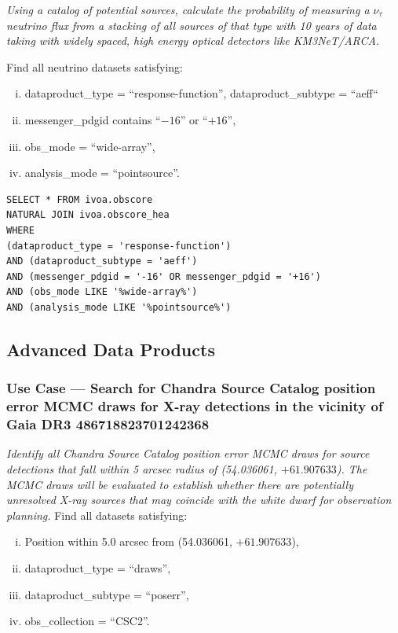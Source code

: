 {\em Using a catalog of potential sources, calculate the probability of measuring a $\nu_{\tau}$ neutrino flux from a stacking of all sources of that type with 10 years of data taking with widely spaced, high energy optical detectors like KM3NeT/ARCA.}

\medskip
\noindent Find all neutrino datasets satisfying:
\begin{enumerate}[(i)]
  \item dataproduct\_type = ``response-function'', dataproduct\_subtype = ``aeff``
  \item messenger\_pdgid contains ``$-16$'' or ``$+16$'',
  \item obs\_mode = ``wide-array'',
  \item analysis\_mode = ``pointsource''.
\end{enumerate}

\begin{verbatim}
SELECT * FROM ivoa.obscore
NATURAL JOIN ivoa.obscore_hea
WHERE
(dataproduct_type = 'response-function')
AND (dataproduct_subtype = 'aeff')
AND (messenger_pdgid = '-16' OR messenger_pdgid = '+16')
AND (obs_mode LIKE '%wide-array%')
AND (analysis_mode LIKE '%pointsource%')
\end{verbatim}

\subsection{Advanced Data Products}

\subsubsection{Use Case --- Search for Chandra Source Catalog position error MCMC draws for X-ray detections in the vicinity of Gaia DR3 486718823701242368}

{\em Identify all Chandra Source Catalog position error MCMC draws for source detections that fall within 5 arcsec radius of  (54.036061, $+61.907633$).  The MCMC draws will be evaluated to establish whether there are potentially unresolved X-ray sources that may coincide with the white dwarf for observation planning.\/}
\medskip
\noindent Find all datasets satisfying:
\begin{enumerate}[(i)]
  \item Position within 5.0 arcsec from (54.036061, $+61.907633$),
  \item dataproduct\_type = ``draws'',
  \item dataproduct\_subtype = ``poserr'',
  \item obs\_collection = ``CSC2''.
\end{enumerate}

